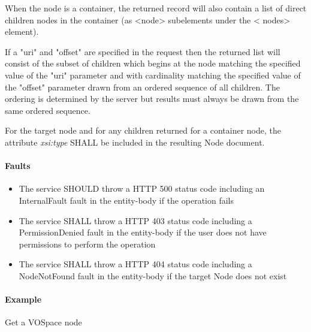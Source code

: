 \documentclass[11pt,a4paper]{ivoa}
\begin{document}
When the node is a container, the returned record will also contain a list of direct children nodes in the container (as <node> subelements under the < nodes> element).

If a "uri" and "offset" are specified in the request then the returned list will consist of the subset of children which begins at the node matching the specified value of the "uri" parameter and with cardinality matching the specified value of the "offset" parameter drawn from an ordered sequence of all children. The ordering is determined by the server but results must always be drawn from the same ordered sequence.

For the target node and for any children returned for a container node, the attribute \emph{xsi:type} SHALL be included in the resulting Node document.  

\paragraph{Faults}
\begin{itemize}
    \item The service SHOULD throw a HTTP 500 status code including an InternalFault fault in the entity-body if the operation fails
    \item The service SHALL throw a HTTP 403 status code including a PermissionDenied fault in the entity-body if the user does not have permissions to perform the operation
    \item The service SHALL throw a HTTP 404 status code including a NodeNotFound fault in the entity-body if the target Node does not exist
\end{itemize}

\paragraph{Example}
Get a VOSpace node
\end{document}
